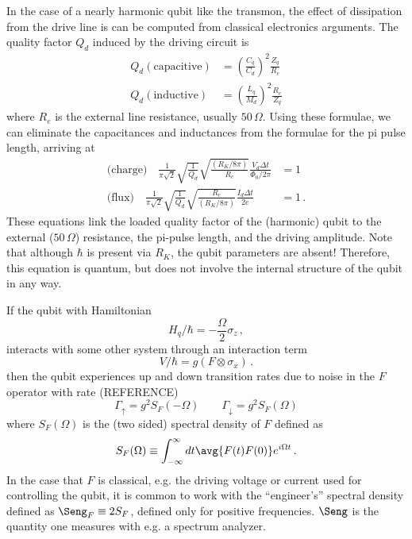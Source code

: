 In the case of a nearly harmonic qubit like the transmon, the effect of dissipation from the drive line is can be computed from classical electronics arguments.
The quality factor $Q_d$ induced by the driving circuit is
\begin{align*}
  Q_d (\text{capacitive}) &= \left( \frac{C_q}{C_d} \right)^2 \frac{Z_q}{R_e} \\
  Q_d (\text{inductive}) &= \left( \frac{L_q}{M_d} \right)^2 \frac{R_e}{Z_q}
\end{align*}
where $R_e$ is the external line resistance, usually $50 \, \Omega$.
Using these formulae, we can eliminate the capacitances and inductances from the formulae for the pi pulse length, arriving at
\begin{align*}
  \text{(charge)} \quad
    \frac{1}{\pi\sqrt{2}} \sqrt{\frac{1}{Q_d}}
    \sqrt{\frac{(R_K/8\pi)}{R_e}} \frac{V_d \Delta t}{\Phi_0/2\pi} &= 1 \\
  \text{(flux)} \quad
    \frac{1}{\pi\sqrt{2}} \sqrt{\frac{1}{Q_d}}
    \sqrt{\frac{R_e}{(R_K/8\pi)}} \frac{I_d \Delta t}{2e} &= 1 \, .
\end{align*}
These equations link the loaded quality factor of the (harmonic) qubit to the external ($50 \, \Omega$) resistance, the pi-pulse length, and the driving amplitude.
Note that although $\hbar$ is present via $R_K$, the qubit parameters are absent!
Therefore, this equation is quantum, but does not involve the internal structure of the qubit in any way.


If the qubit with Hamiltonian
\begin{equation*}
  H_q / \hbar = - \frac{\Omega}{2} \sigma_z \, ,
\end{equation*}
interacts with some other system through an interaction term
\begin{equation*}
  V / \hbar = g(F \otimes \sigma_x) \, .
\end{equation*}
then the qubit experiences up and down transition rates due to noise in the $F$ operator with rate (REFERENCE)
\begin{equation*}
  \Gamma_\uparrow = g^2 S_F(- \Omega) \qquad \Gamma_\downarrow = g^2 S_F(\Omega)
\end{equation*}
where $S_F(\Omega)$ is the (two sided) spectral density of $F$ defined as
\begin{equation*}
  S_F(\Omega) \equiv \int_{-\infty}^\infty dt \avg{F(t) F(0)} e^{i \Omega t} \, .
\end{equation*}
In the case that $F$ is classical, e.g. the driving voltage or current used for controlling the qubit, it is common to work with the ``engineer's'' spectral density defined as $\Seng_F \equiv 2 S_F$, defined only for positive frequencies.
$\Seng$ is the quantity one measures with e.g. a spectrum analyzer.

